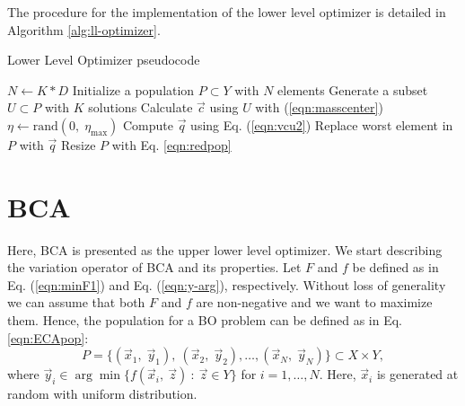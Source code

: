 \documentclass[conference]{IEEEtran}
\begin{document}
The procedure for the implementation of the lower level optimizer is detailed in
Algorithm \ref{alg:ll-optimizer}.
% 
\begin{algorithm}[b]
    \caption{Lower Level Optimizer pseudocode}
    \label{alg:ll-optimizer}
    \begin{algorithmic}[1]
        \STATE $N \gets K*D$
        \STATE Initialize a population $P \subset Y$ with $N$ elements
                \STATE Generate a subset $U \subset P$ with $K$ solutions
                \STATE Calculate $\vec{c}$ using $U$ with (\ref{eqn:masscenter})
                \STATE $\eta \gets \text{rand}(0,\; \eta_{\max}) $ 
                \STATE Compute $\vec{q}$ using Eq. (\ref{eqn:vcu2})
                    \STATE Replace worst element in $P$ with $\vec{q}$
                \ENDIF
            \ENDFOR
            \STATE Resize $P$ with Eq. \ref{eqn:redpop}
        \ENDWHILE
    \end{algorithmic}
\end{algorithm}




\section{BCA} %
\label{sec:bca}

Here, BCA is presented as the upper lower level optimizer. We start describing the
variation operator of BCA and its properties. Let $F$ and $f$ be 
defined as in Eq. (\ref{eqn:minF1}) and Eq. (\ref{eqn:y-arg}), respectively.
Without loss of generality we can assume that both $F$ and $f$ are non-negative
and we want to maximize them. Hence, the population for a BO problem can be
defined as in Eq. \ref{eqn:ECApop}: 
\begin{equation}
    P = \{ (\vec{x}_1,\; \vec{y}_1), \ (\vec{x}_2,\; \vec{y}_2), \ldots,
           (\vec{x}_N,\; \vec{y}_N)
         \}
         \subset X \times Y,
        \label{eqn:ECApop}
\end{equation}
where $\vec{y}_i \in \arg \min \{ f(\vec{x}_i, \ \vec{z}) \ : \ \vec{z} \in Y \}$
for $i = 1,\ldots,N$. Here, $\vec{x}_i$ is generated at random with uniform distribution.
% 
\end{document}
